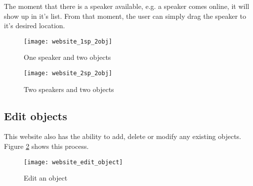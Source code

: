 The moment that there is a speaker available, e.g. a speaker comes online, it will show up in it's  list.
From that moment, the user can simply drag the speaker to it's desired location.

\begin{figure}[H]
    \centering
        \begin{minipage}[b]{0.5\textwidth}
            \centering
            \texttt{[image: website\_1sp\_2obj]}
            \caption{One speaker and two objects}
            \label{fig:website_1sp_2obj}
        \end{minipage}%
        \begin{minipage}[b]{0.5\textwidth}
            \centering
            \texttt{[image: website\_2sp\_2obj]}
            \caption{Two speakers and two objects}
            \label{fig:website_2sp_2obj}
    \end{minipage}
\end{figure}

\subsection{Edit objects}
\label{sub:website_edit_objects}
This website also has the ability to add, delete or modify any existing objects.
Figure \ref{fig:website_edit_object} shows this process.

\begin{figure}[H]
    \centering
    \texttt{[image: website\_edit\_object]}
    \caption{Edit an object}
    \label{fig:website_edit_object}
\end{figure}

